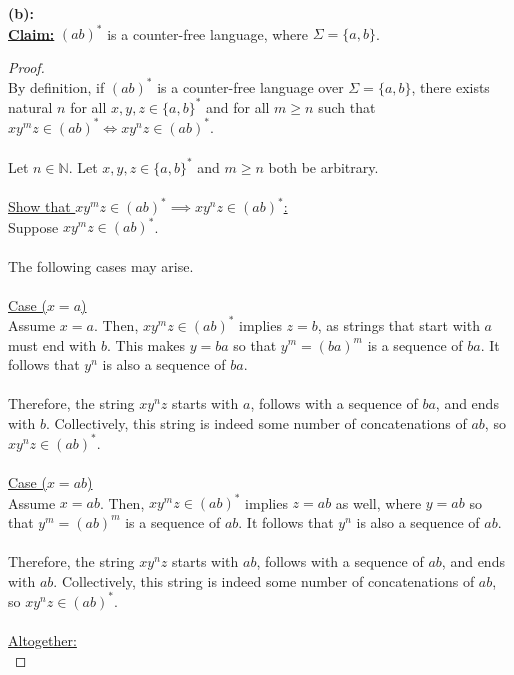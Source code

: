 \documentclass[12pt]{article}
\begin{document}
\textbf{(b):} \\
\textbf{\underline{Claim:}} $(ab)^*$ is a counter-free language, where $\Sigma = \{ a, b \} $. 
\begin{proof}
\leavevmode\\
    By definition, if $(ab)^*$ is a counter-free language over $\Sigma = \{a, b\}$, there exists natural $n$ for all $x, y, z \in \{ a, b \}^*$ and for all $m \geq n$ such that $xy^mz \in (ab)^* \iff xy^nz \in (ab)^*$. \\
    \\
    Let $n \in \mathbb{N}$. Let $x, y, z \in \{ a, b \}^*$ and $m \geq n$ both be arbitrary. \\
    \\
    \underline{Show that $xy^mz \in (ab)^* \implies xy^nz \in (ab)^*$:} \\
    Suppose $xy^mz \in (ab)^*$. \\
    \\
    The following cases may arise. \\
    \\
    \underline{Case ($x = a$)} \\
    Assume $x = a$. Then, $xy^mz \in (ab)^*$ implies $z = b$, as strings that start with $a$ must end with $b$. This makes $y = ba$ so that $y^m = (ba)^m$ is a sequence of $ba$. It follows that $y^n$ is also a sequence of $ba$. \\
    \\
    Therefore, the string $xy^nz$ starts with $a$, follows with a sequence of $ba$, and ends with $b$. Collectively, this string is indeed some number of concatenations of $ab$, so $xy^nz \in (ab)^*$. \\
    \\
    \underline{Case ($x = ab$)} \\
    Assume $x = ab$. Then, $xy^mz \in (ab)^*$ implies $z = ab$ as well, where $y = ab$ so that $y^m = (ab)^m$ is a sequence of $ab$. It follows that $y^n$ is also a sequence of $ab$. \\
    \\
    Therefore, the string $xy^nz$ starts with $ab$, follows with a sequence of $ab$, and ends with $ab$. Collectively, this string is indeed some number of concatenations of $ab$, so $xy^nz \in (ab)^*$. \\
    \\
    \underline{Altogether:} \\

\end{proof}
\end{document}
